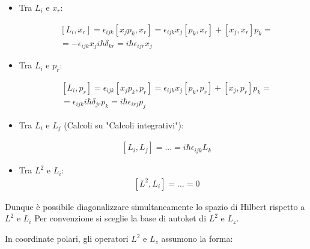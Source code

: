 \documentclass{article}
\begin{document}
\begin{itemize}
    \item Tra $L_i$ e $x_r$:

          \begin{equation}
              \begin{aligned}
                   & [L_i, x_r]= \epsilon_{ijk}[x_jp_k, x_r]=\epsilon_{ijk}{x_j[p_k, x_r]+[x_j, x_r]p_k} = \\
                   & = -\epsilon_{ijk}{x_ji\hbar\delta_{kr}}=i\hbar\epsilon_{ijr}x_j
              \end{aligned}
          \end{equation}
    \item Tra $L_i$ e $p_r$:

          \begin{equation}
              \begin{aligned}
                   & [L_i, p_r]= \epsilon_{ijk}[x_jp_k, p_r]= \epsilon_{ijk}{x_j[p_k, p_r]+[x_j, p_r]p_k}= \\
                   & = \epsilon_{ijk}{i\hbar \delta_{jr}p_k}=i\hbar\epsilon_{irj}p_j
              \end{aligned}
          \end{equation}


    \item Tra $L_i$ e $L_j$ (Calcoli su "Calcoli integrativi"):

          \begin{equation}
              \begin{aligned}
                   & [L_i,L_j]=...=i\hbar\epsilon_{ijk}L_k
              \end{aligned}
          \end{equation}

    \item Tra $L^2$ e $L_i$:
          \begin{equation}
              \begin{aligned}
                   & [L^2,L_i]=...=0
              \end{aligned}
          \end{equation}
\end{itemize}

Dunque è possibile diagonalizzare simultaneamente lo spazio di Hilbert rispetto a $L^2$ e $L_i$
Per convenzione si sceglie la base di autoket di $L^2$ e $L_z$.

In coordinate polari, gli operatori $L^2$ e $L_z$ assumono la forma:
\end{document}
